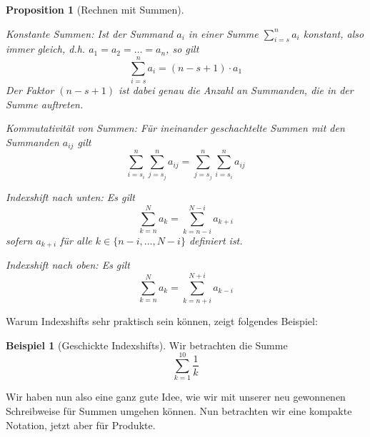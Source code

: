 \documentclass[11pt,reqno, a4paper]{book}
\newcommand{\normal}[1]{{\normalfont #1}}
\theoremstyle{mystyle}
\newtheorem{proposition}[theorem]{Proposition}
\theoremstyle{definition}
\newtheorem{exampleth}[theorem]{Beispiel}
\numberwithin{equation}{chapter}
\begin{document}
\begin{proposition}[Rechnen mit Summen]\label{prop:rechnen-mit-summen}
    \begin{thmenum}
        \item \normal{Konstante Summen:} Ist der Summand \(a_i\) in einer Summe \(\sum_{i=s}^n a_i\) konstant, also immer gleich, d.h. \(a_1 = a_2 = \dots = a_n\), so gilt \begin{equation*}
            \sum_{i=s}^n a_i = (n-s+1)\cdot a_1
        \end{equation*}
        Der Faktor \((n-s+1)\) ist dabei genau die Anzahl an Summanden, die in der Summe auftreten. 

        \item \label{prop:rechnen-mit-summen-(2)} \normal{Kommutativität von Summen:} Für ineinander geschachtelte Summen mit den Summanden \(a_{ij}\) gilt 
        \begin{equation*}
            \sum_{i=s_i}^n \sum_{j=s_j}^n a_{ij} = \sum_{j=s_j}^n \sum_{i=s_i}^n a_{ij}
        \end{equation*}

        \item \normal{Indexshift nach unten}: Es gilt 
        \begin{equation*}
            \sum_{k=n}^N a_k = \sum_{k=n-i}^{N-i} a_{k+i}
        \end{equation*}
        sofern \(a_{k+i}\) für alle \(k\in \{n-i, \dots, N-i\}\) definiert ist. 

        \item \normal{Indexshift nach oben}: Es gilt 
        \begin{equation*}
            \sum_{k=n}^N a_k = \sum_{k=n+i}^{N+i} a_{k-i}
        \end{equation*}
        
    \end{thmenum}
\end{proposition}
Warum Indexshifts sehr praktisch sein können, zeigt folgendes Beispiel:  

\begin{exampleth}[Geschickte Indexshifts]
    Wir betrachten die Summe 
    \begin{equation*}
        \sum_{k=1}^{10} \frac{1}{k}
    \end{equation*}
    
\end{exampleth}

Wir haben nun also eine ganz gute Idee, wie wir mit unserer neu gewonnenen Schreibweise für Summen umgehen können. Nun betrachten wir eine kompakte Notation, jetzt aber für Produkte. 
\end{document}
